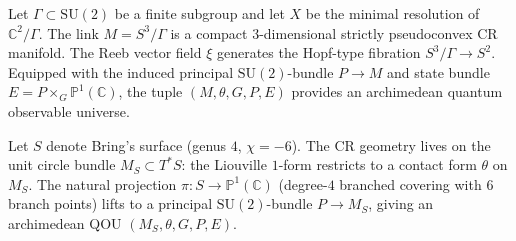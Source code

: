\begin{example}
  \label{ex:ale}
Let $\Gamma \subset \mathrm{SU}(2)$ be a finite subgroup and let $X$ be the
minimal resolution of $\mathbb{C}^2 / \Gamma$.  The link
$M = S^3 / \Gamma$ is a compact $3$-dimensional strictly pseudoconvex
CR manifold.  The Reeb vector field $\xi$ generates the Hopf-type
fibration $S^3/\Gamma \to S^2$.  Equipped with the induced principal
$\mathrm{SU}(2)$-bundle $P \to M$ and state bundle
$E = P \times_G \mathbb{P}^1(\mathbb{C})$, the tuple
$(M, \theta, G, P, E)$ provides an archimedean quantum observable universe.
\end{example}

\begin{example}
  \label{ex:brings-surface}
Let $S$ denote Bring's surface (genus $4$, $\chi = -6$).  The CR geometry
lives on the unit circle bundle $M_S \subset T^*S$: the Liouville
$1$-form restricts to a contact form $\theta$ on $M_S$.  The natural
projection $\pi \colon S \to \mathbb{P}^1(\mathbb{C})$ (degree-$4$
branched covering with $6$ branch points) lifts to a principal
$\mathrm{SU}(2)$-bundle $P \to M_S$, giving an archimedean QOU
$(M_S, \theta, G, P, E)$.
\end{example}

